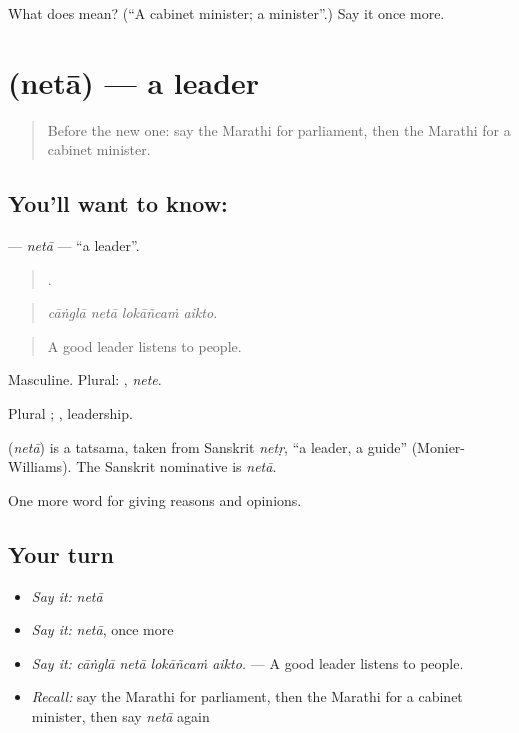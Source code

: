 \begin{tcolorbox}[breakable,colback=teal!4,colframe=teal!35!black,title={Before you move on}]
What does  mean? (\textquotedblleft{}A cabinet minister; a minister\textquotedblright{}.) Say it once more.
\end{tcolorbox}
\section[\texorpdfstring{\mr{नेता} (netā)}{नेता (netā)}]{ (netā) — a leader}

\label{lesson:MR-C357-neta}



\begin{quote}
Before the new one: say the Marathi for parliament, then the Marathi for a cabinet minister.
\end{quote}

\subsection*{You'll want to know: }
\textbf{} — \emph{netā} — \textquotedblleft{}a leader\textquotedblright{}.

\begin{quote}
   .
\end{quote}

\begin{quote}
\emph{cāṅglā netā lokāñcaṁ aikto.}
\end{quote}

\begin{quote}
A good leader listens to people.
\end{quote}

Masculine. Plural: , \emph{nete}.

Plural ; , leadership.

\begin{cousinweb}
\textbf{} (\emph{netā}) is a tatsama, taken from Sanskrit \emph{netṛ}, \textquotedblleft{}a leader, a guide\textquotedblright{} (Monier-Williams). The Sanskrit nominative is \emph{netā}.
\end{cousinweb}

\begin{grammarlens}[title={What you've built}]
One more word for giving reasons and opinions.
\end{grammarlens}

\subsection*{Your turn}
\begin{itemize}
\raggedright
  \item \emph{Say it:} \emph{netā}
  \item \emph{Say it:} \emph{netā}, once more
  \item \emph{Say it:} \emph{cāṅglā netā lokāñcaṁ aikto.} — A good leader listens to people.
  \item \emph{Recall:} say the Marathi for parliament, then the Marathi for a cabinet minister, then say \emph{netā} again
\end{itemize}

